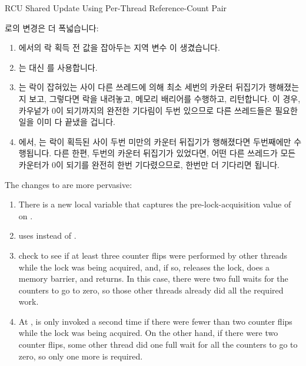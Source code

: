\fi

\begin{listing}[tbp]

\caption{RCU Shared Update Using Per-Thread Reference-Count Pair}
\label{lst:app:toyrcu:RCU Shared Update Using Per-Thread Reference-Count Pair}
\end{listing}

\begin{fcvref}
 로의 변경은 더 폭넓습니다:
\begin{enumerate}
\item	{} 에서의 락 획득 전  값을 잡아두는 지역 변수
	 이 생겼습니다.
\item	{} 는  대신  를 사용합니다.
\item	{} 는 락이 잡혀있는 사이 다른 쓰레드에 의해 최소
	세번의 카운터 뒤집기가 행해졌는지 보고, 그렇다면 락을 내려놓고, 메모리
	배리어를 수행하고, 리턴합니다.
	이 경우, 카우넡가 0이 되기까지의 완전한 기다림이 두번 있으므로 다른
	쓰레드들은 필요한 일을 이미 다 끝냈을 겁니다.
\item	{} 에서,  는 락이
	획득된 사이 두번 미만의 카운터 뒤집기가 행해졌다면 두번째에만
	수행됩니다.
	다른 한편, 두번의 카운터 뒤집기가 있었다면, 어떤 다른 쓰레드가 모든
	카운터가 0이 되기를 완전히 한번 기다렸으므로, 한번만 더 기다리면
	됩니다.
\end{enumerate}
\end{fcvref}

\iffalse

\begin{fcvref}
The changes to  are more pervasive:
\begin{enumerate}
\item	There is a new  local variable that captures
	the pre-lock-acquisition value of  on
	.
\item	{} uses  instead of .
\item	{} check to see if at least three counter flips were
	performed by other threads while the lock was being acquired,
	and, if so, releases the lock, does a memory barrier, and returns.
	In this case, there were two full waits for the counters to
	go to zero, so those other threads already did all the required work.
\item	At ,  is only
	invoked a second time if there were fewer than two counter flips
	while the lock was being acquired.
	On the other hand, if there were two counter flips, some other
	thread did one full wait for all the counters to go to zero,
	so only one more is required.
\end{enumerate}
\end{fcvref}

